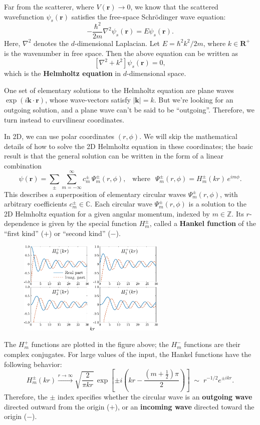 \documentclass[pra,12pt]{revtex4}
\begin{document}
Far from the scatterer, where $V(\mathbf{r})\rightarrow 0$, we know
that the scattered wavefunction $\psi_s(\mathbf{r})$ satisfies the
free-space Schr\"odinger wave equation:
$$-\frac{\hbar^2}{2m} \nabla^2 \psi_s(\mathbf{r}) = E \psi_s(\mathbf{r}).$$
Here, $\nabla^2$ denotes the $d$-dimensional Laplacian.  Let $E =
\hbar^2 k^2 / 2m$, where $k \in \mathbf{R}^+$ is the wavenumber in
free space.  Then the above equation can be written as
$$\left[\nabla^2 + k^2\right] \psi_s(\mathbf{r}) = 0,$$
which is the \textbf{Helmholtz equation} in $d$-dimensional space.

One set of elementary solutions to the Helmholtz equation are plane
waves $\exp(i\mathbf{k}\cdot\mathbf{r})$, whose wave-vectors satisfy
$|\mathbf{k}| = k$.  But we're looking for an outgoing solution, and
a plane wave can't be said to be ``outgoing''.  Therefore, we turn
instead to curvilinear coordinates.

In 2D, we can use polar coordinates $(r,\phi)$.  We will skip the
mathematical details of how to solve the 2D Helmholtz equation in
these coordinates; the basic result is that the general solution can
be written in the form of a linear combination
$$\psi(\mathbf{r})=\sum_{\pm}\sum_{m=-\infty}^\infty c_m^\pm\,\Psi_m^\pm(r,\phi), \;\;\;\mathrm{where}\;\;\,\Psi_m^\pm(r,\phi) = H_m^\pm(kr)\,e^{im\phi}.$$
This describes a superposition of elementary circular waves
$\Psi_m^\pm(r,\phi)$, with arbitrary coefficients $c_m^\pm \in
\mathbb{C}$.  Each circular wave $\Psi_m^\pm(r,\phi)$ is a solution to
the 2D Helmholtz equation for a given angular momentum, indexed by $m
\in \mathbb{Z}$.  Its $r$-dependence is given by the special function
$H_m^\pm$, called a \textbf{Hankel function} of the ``first kind''
($+$) or ``second kind'' ($-$).

\begin{figure}[h!]
  \centering\includegraphics[width=0.63\textwidth]{besselh}
\end{figure}

The $H^+_m$ functions are plotted in the figure above; the $H^-_m$
functions are their complex conjugates.  For large values of the
input, the Hankel functions have the following behavior:
$$H_m^\pm(kr) \overset{r\rightarrow\infty}{\longrightarrow} \sqrt{\frac{2}{\pi kr}} \, \exp\left[\pm i\left(kr - \frac{(m+\frac{1}{2})\pi}{2}\right)\right] \;\sim\; r^{-1/2} e^{\pm ikr}.$$
Therefore, the $\pm$ index specifies whether the circular wave is an
\textbf{outgoing wave} directed outward from the origin ($+$), or an
\textbf{incoming wave} directed toward the origin ($-$).
\end{document}
